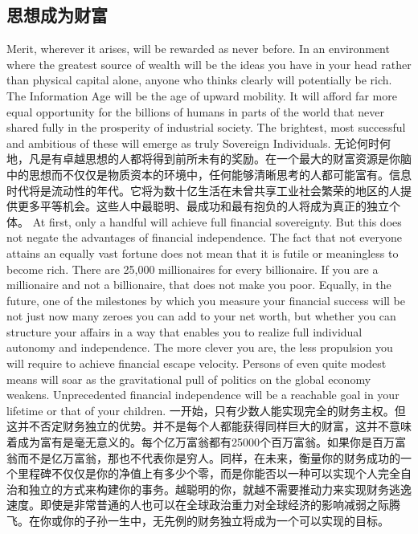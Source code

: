\subsection{思想成为财富}
\begin{paracol}{2}[]
Merit, wherever it arises, will be rewarded as never before. In an environment where the greatest source of wealth will be the ideas you have in your head rather than physical capital alone, anyone who thinks clearly will potentially be rich. The Information Age will be the age of upward mobility. It will afford far more equal opportunity for the billions of humans in parts of the world that never shared fully in the prosperity of industrial society. The brightest, most successful and ambitious of these will emerge as truly Sovereign Individuals. 
\switchcolumn
无论何时何地，凡是有卓越思想的人都将得到前所未有的奖励。在一个最大的财富资源是你脑中的思想而不仅仅是物质资本的环境中，任何能够清晰思考的人都可能富有。信息时代将是流动性的年代。它将为数十亿生活在未曾共享工业社会繁荣的地区的人提供更多平等机会。这些人中最聪明、最成功和最有抱负的人将成为真正的独立个体。
\switchcolumn*
At first, only a handful will achieve full financial sovereignty. But this does not negate the advantages of financial independence. The fact that not everyone attains an equally vast fortune does not mean that it is futile or meaningless to become rich. There are 25,000 millionaires for every billionaire. If you are a millionaire and not a billionaire, that does not make you poor. Equally, in the future, one of the milestones by which you measure your financial success will be not just now many zeroes you can add to your net worth, but whether you can structure your affairs in a way that enables you to realize full individual autonomy and independence. The more clever you are, the less propulsion you will require to achieve financial escape velocity. Persons of even quite modest means will soar as the gravitational pull of politics on the global economy weakens. Unprecedented financial independence will be a reachable goal in your lifetime or that of your children.
\switchcolumn
一开始，只有少数人能实现完全的财务主权。但这并不否定财务独立的优势。并不是每个人都能获得同样巨大的财富，这并不意味着成为富有是毫无意义的。每个亿万富翁都有25000个百万富翁。如果你是百万富翁而不是亿万富翁，那也不代表你是穷人。同样，在未来，衡量你的财务成功的一个里程碑不仅仅是你的净值上有多少个零，而是你能否以一种可以实现个人完全自治和独立的方式来构建你的事务。越聪明的你，就越不需要推动力来实现财务逃逸速度。即使是非常普通的人也可以在全球政治重力对全球经济的影响减弱之际腾飞。在你或你的子孙一生中，无先例的财务独立将成为一个可以实现的目标。

\end{paracol}
